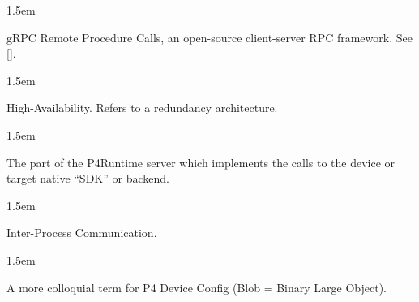 \documentclass[11pt]{article}
\begin{document}
{\begin{mddefinitions}

\begin{mdbmarginx}{}{}{}{1.5em}%
\begin{mddefdata}%
gRPC Remote Procedure Calls, an open-source client-server RPC framework. See
[].
\end{mddefdata}%
\end{mdbmarginx}%


\begin{mdbmarginx}{}{}{}{1.5em}%
\begin{mddefdata}%
High-Availability. Refers to a redundancy architecture.
\end{mddefdata}%
\end{mdbmarginx}%


\begin{mdbmarginx}{}{}{}{1.5em}%
\begin{mddefdata}%
The part of the P4Runtime server which implements the calls to the device or
target native \textquotedblleft{}SDK\textquotedblright{} or backend.
\end{mddefdata}%
\end{mdbmarginx}%


\begin{mdbmarginx}{}{}{}{1.5em}%
\begin{mddefdata}%
Inter-Process Communication.
\end{mddefdata}%
\end{mdbmarginx}%


\begin{mdbmarginx}{}{}{}{1.5em}%
\begin{mddefdata}%
A more colloquial term for P4 Device Config (Blob = Binary Large Object).
\end{mddefdata}%
\end{mdbmarginx}%



\end{mddefinitions}}
\end{document}
